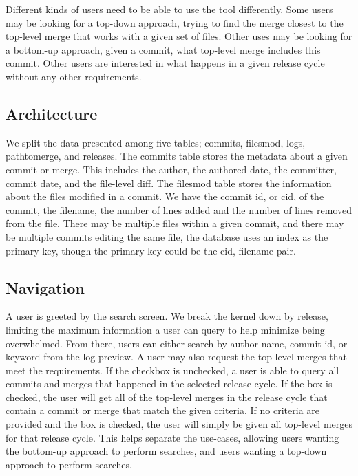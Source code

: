 \documentclass[conference, draftclsnofoot]{IEEEtran}
\begin{document}


Different kinds of users need to be able to use the tool differently.
Some users may be looking for a top-down approach, trying to find the merge
closest to the top-level merge that works with a given set of files. Other uses
may be looking for a bottom-up approach, given a commit, what top-level merge
includes this commit. Other users are interested in what happens in a given
release cycle without any other requirements.

\subsection{Architecture}

We split the data presented among five tables; commits, filesmod, logs,
pathtomerge, and releases. The commits table stores the metadata about a given
commit or merge. This includes the author, the authored date, the committer,
commit date, and the file-level diff. The filesmod table stores the information
about the files modified in a commit. We have the commit id, or cid, of the
commit, the filename, the number of lines added and the number of lines removed
from the file. There may be multiple files within a given commit, and there may
be multiple commits editing the same file, the database uses an index as the
primary key, though the primary key could be the cid, filename pair.


%


\subsection{Navigation}

A user is greeted by the search screen. We break the kernel down by release,
limiting the maximum information a user can query to help minimize being
overwhelmed. From there, users can either search by author name, commit id, or
keyword from the log preview. A user may also request the top-level merges that
meet the requirements. If the checkbox is unchecked, a user is able to query
all commits and merges that happened in the selected release cycle. If the box
is checked, the user will get all of the top-level merges in the release cycle
that contain a commit or merge that match the given criteria. If no criteria
are provided and the box is checked, the user will simply be given all
top-level merges for that release cycle. This helps separate the use-cases,
allowing users wanting the bottom-up approach to perform searches, and users
wanting a top-down approach to perform searches.
\end{document}
